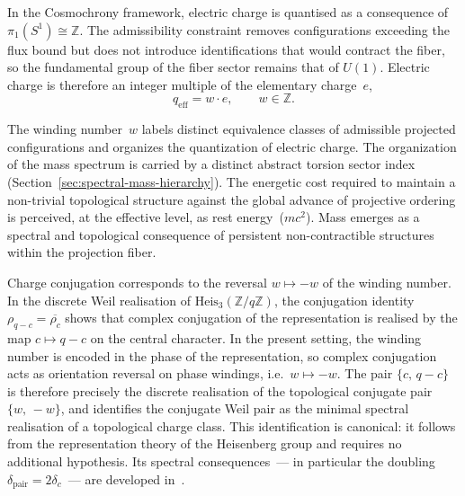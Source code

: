     \begin{proposition}
      \label{prop:charge-quantisation}
      In the Cosmochrony framework, electric charge is quantised as a consequence of
      $\pi_1(S^1) \cong \mathbb{Z}$.
      The admissibility constraint removes configurations exceeding the flux bound
      but does not introduce identifications that would contract the fiber,
      so the fundamental group of the fiber sector remains that of $U(1)$.
      Electric charge is therefore an integer multiple of the elementary charge~$e$,
      \begin{equation}
        q_{\mathrm{eff}} = w \cdot e, \qquad w \in \mathbb{Z}.
      \end{equation}
    \end{proposition}

    The winding number~$w$ labels distinct equivalence classes of admissible
    projected configurations and organizes the quantization of electric
    charge.
    The organization of the mass spectrum is carried by a distinct abstract
    torsion sector index (Section~\ref{sec:spectral-mass-hierarchy}).
    The energetic cost required to maintain a non-trivial topological
    structure against the global advance of projective ordering is
    perceived, at the effective level, as rest energy~($mc^2$).
    Mass emerges as a spectral and topological consequence of persistent
    non-contractible structures within the projection fiber.

    \begin{remark}
      \label{rem:winding-conjugation}
      Charge conjugation corresponds to the reversal $w \mapsto -w$ of the
      winding number.
      In the discrete Weil realisation of $\mathrm{Heis}_3(\mathbb{Z}/q\mathbb{Z})$,
      the conjugation identity $\rho_{q-c} = \overline{\rho_c}$ shows that
      complex conjugation of the representation is realised by the map
      $c \mapsto q - c$ on the central character.
      In the present setting, the winding number is encoded in the phase of
      the representation, so complex conjugation acts as orientation reversal
      on phase windings, i.e.\ $w \mapsto -w$.
      The pair $\{c,\, q-c\}$ is therefore precisely the discrete realisation of
      the topological conjugate pair $\{w,\,-w\}$, and identifies the conjugate
      Weil pair as the minimal spectral realisation of a topological charge class.
      This identification is canonical: it follows from the representation
      theory of the Heisenberg group and requires no additional hypothesis.
      Its spectral consequences~--- in particular the doubling
      $\delta_{\mathrm{pair}} = 2\delta_c$~--- are developed in~\cite{Beau2026a21,Beau2026k}.
    \end{remark}


